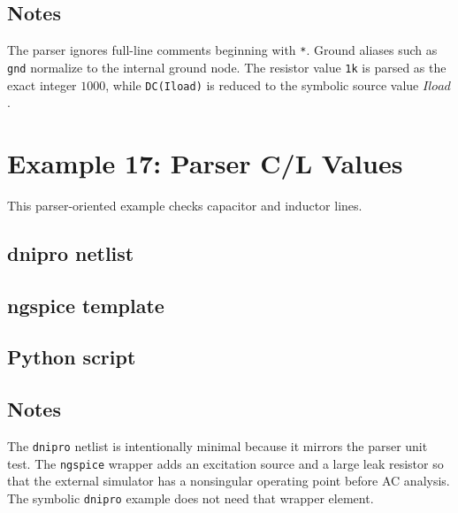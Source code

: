 \documentclass[11pt,a4paper]{article}
\newcommand{\project}{\texttt{dnipro}}
\newcommand{\code}[1]{\texttt{#1}}
\newcommand{\ngspice}{\texttt{ngspice}}
\begin{document}


\subsection{Notes}

The parser ignores full-line comments beginning with \code{*}. Ground aliases
such as \code{gnd} normalize to the internal ground node. The resistor value
\code{1k} is parsed as the exact integer \(1000\), while \code{DC(Iload)} is
reduced to the symbolic source value \(Iload\).

\section{Example 17: Parser C/L Values}
\label{sec:ex-parser-cl}

This parser-oriented example checks capacitor and inductor lines.

\subsection{dnipro netlist}



\subsection{ngspice template}



\subsection{Python script}



\subsection{Notes}

The \project{} netlist is intentionally minimal because it mirrors the parser
unit test. The \ngspice{} wrapper adds an excitation source and a large leak
resistor so that the external simulator has a nonsingular operating point before
AC analysis. The symbolic \project{} example does not need that wrapper element.
\end{document}
